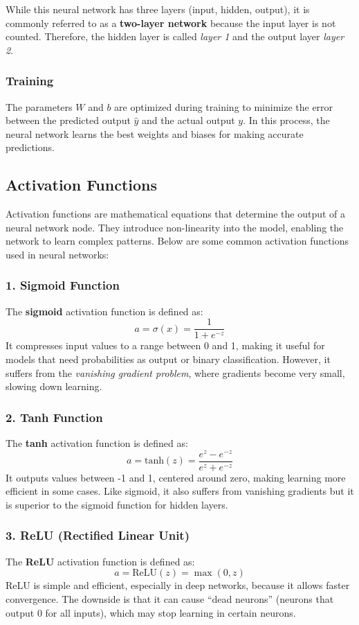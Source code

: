 \documentclass[letterpaper,12pt,notitlepage,twoside]{report}
\begin{document}
While this neural network has three layers (input, hidden, output), it is commonly referred to as a \textbf{two-layer network} because the input layer is not counted. Therefore, the hidden layer is called \textit{layer 1} and the output layer \textit{layer 2}.

\subsubsection{Training}
The parameters \( W \) and \( b \) are optimized during training to minimize the error between the predicted output \( \hat{y} \) and the actual output \( y \). In this process, the neural network learns the best weights and biases for making accurate predictions.

\subsection{Activation Functions}
Activation functions are mathematical equations that determine the output of a neural network node. They introduce non-linearity into the model, enabling the network to learn complex patterns. Below are some common activation functions used in neural networks:

\subsubsection{1. Sigmoid Function}
The \textbf{sigmoid} activation function is defined as:
\[
a = \sigma(x) = \frac{1}{1 + e^{-z}}
\]
It compresses input values to a range between 0 and 1, making it useful for models that need probabilities as output or binary classification. However, it suffers from the \textit{vanishing gradient problem}, where gradients become very small, slowing down learning.

\subsubsection{2. Tanh Function}
The \textbf{tanh} activation function is defined as:
\[
a = \text{tanh}(z) = \frac{e^{z} - e^{-z}}{e^{z} + e^{-z}}
\]
It outputs values between -1 and 1, centered around zero, making learning more efficient in some cases. Like sigmoid, it also suffers from vanishing gradients but it is superior to the sigmoid function for hidden layers.

\subsubsection{3. ReLU (Rectified Linear Unit)}
The \textbf{ReLU} activation function is defined as:
\[
a = \text{ReLU}(z) = \max(0, z)
\]
ReLU is simple and efficient, especially in deep networks, because it allows faster convergence. The downside is that it can cause ``dead neurons'' (neurons that output 0 for all inputs), which may stop learning in certain neurons.
\end{document}
